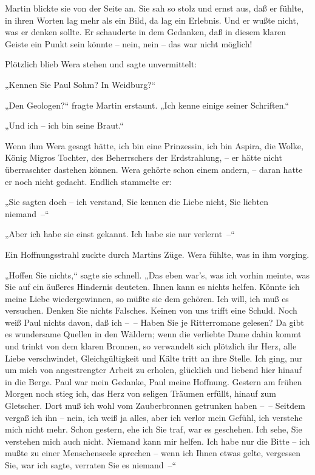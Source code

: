 Martin blickte sie von der Seite an. Sie sah so stolz und ernst
aus, daß er fühlte, in ihren Worten lag mehr als ein Bild, da lag
ein Erlebnis. Und er wußte nicht, was er denken sollte. Er
schauderte in dem Gedanken, daß in diesem klaren Geiste ein Punkt
sein könnte – nein, nein – das war nicht möglich!

Plötzlich blieb Wera stehen und sagte unvermittelt:

„Kennen Sie Paul Sohm? In Weidburg?“

„Den Geologen?“ fragte Martin erstaunt. „Ich kenne einige seiner
Schriften.“

„Und ich – ich bin seine Braut.“

Wenn ihm Wera gesagt hätte, ich bin eine Prinzessin, ich bin
Aspira, die Wolke, König Migros Tochter, des Beherrschers der
Erdstrahlung, – er hätte nicht überraschter dastehen können. Wera
gehörte schon einem andern, – daran hatte er noch nicht gedacht.
Endlich stammelte er:

„Sie sagten doch – ich verstand, Sie kennen die Liebe nicht, Sie
liebten niemand~–“

„Aber ich habe sie einst gekannt. Ich habe sie nur verlernt~–“

Ein Hoffnungsstrahl zuckte durch Martins Züge. Wera fühlte, was in
ihm vorging.

„Hoffen Sie nichts,“ sagte sie schnell. „Das eben war's, was ich
vorhin meinte, was Sie auf ein äußeres Hindernis deuteten. Ihnen
kann es nichts helfen. Könnte ich meine Liebe wiedergewinnen, so
müßte sie dem gehören. Ich will, ich muß es versuchen. Denken Sie
nichts Falsches. Keinen von uns trifft eine Schuld. Noch weiß Paul
nichts davon, daß ich –~– Haben Sie je Ritterromane gelesen? Da
gibt es wundersame Quellen in den Wäldern; wenn die verliebte Dame
dahin kommt und trinkt von dem klaren Bronnen, so verwandelt sich
plötzlich ihr Herz, alle Liebe verschwindet, Gleichgültigkeit und
Kälte tritt an ihre Stelle. Ich ging, nur um mich von angestrengter
Arbeit zu erholen, glücklich und liebend hier hinauf in die Berge.
Paul war mein Gedanke, Paul meine Hoffnung. Gestern am frühen
Morgen noch stieg ich, das Herz von seligen Träumen erfüllt, hinauf
zum Gletscher. Dort muß ich wohl vom Zauberbronnen getrunken haben
–~– Seitdem vergaß ich ihn – nein, ich weiß ja alles, aber ich
verlor mein Gefühl, ich verstehe mich nicht mehr. Schon gestern,
ehe ich Sie traf, war es geschehen. Ich sehe, Sie verstehen mich
auch nicht. Niemand kann mir helfen. Ich habe nur die Bitte – ich
mußte zu einer Menschenseele sprechen – wenn ich Ihnen etwas gelte,
vergessen Sie, war ich sagte, verraten Sie es niemand~–“

